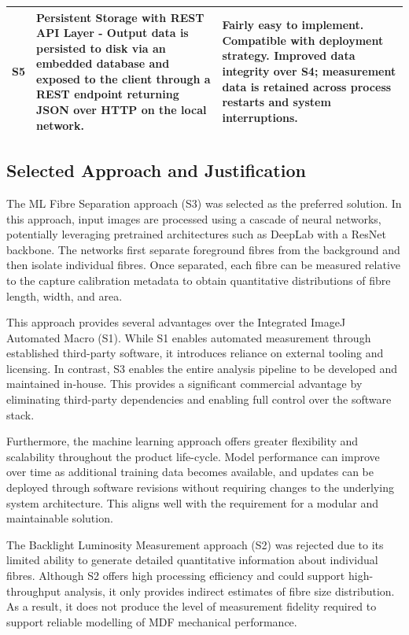 \documentclass[11pt,a4paper]{article}
\begin{document}
\begin{longtable}{@{}p{1cm}p{7cm}p{7cm}@{}}
S5 & Persistent Storage with REST API Layer - Output data is persisted to disk via an embedded database and exposed to the client through a REST endpoint returning JSON over HTTP on the local network.& Fairly easy to implement. Compatible with deployment strategy. Improved data integrity over S4; measurement data is retained across process restarts and system interruptions. \\

\bottomrule
\end{longtable}

\subsection{Selected Approach and Justification}

The ML Fibre Separation approach (S3) was selected as the preferred solution. In this approach, input images are processed using a cascade of neural networks, potentially leveraging pretrained architectures such as DeepLab with a ResNet backbone. The networks first separate foreground fibres from the background and then isolate individual fibres. Once separated, each fibre can be measured relative to the capture calibration metadata to obtain quantitative distributions of fibre length, width, and area.

This approach provides several advantages over the Integrated ImageJ Automated Macro (S1). While S1 enables automated measurement through established third-party software, it introduces reliance on external tooling and licensing. In contrast, S3 enables the entire analysis pipeline to be developed and maintained in-house. This provides a significant commercial advantage by eliminating third-party dependencies and enabling full control over the software stack.

Furthermore, the machine learning approach offers greater flexibility and scalability throughout the product life-cycle. Model performance can improve over time as additional training data becomes available, and updates can be deployed through software revisions without requiring changes to the underlying system architecture. This aligns well with the requirement for a modular and maintainable solution.

The Backlight Luminosity Measurement approach (S2) was rejected due to its limited ability to generate detailed quantitative information about individual fibres. Although S2 offers high processing efficiency and could support high-throughput analysis, it only provides indirect estimates of fibre size distribution. As a result, it does not produce the level of measurement fidelity required to support reliable modelling of MDF mechanical performance.
\end{document}
